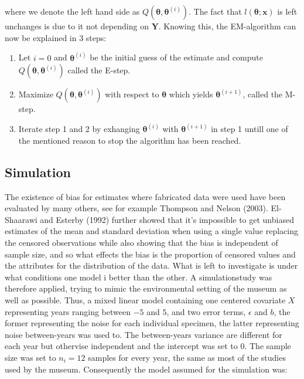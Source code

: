 \documentclass[]{article}
\providecommand{\tightlist}{%
  \setlength{\itemsep}{0pt}\setlength{\parskip}{0pt}}
\begin{document}
where we denote the left hand side as
\(Q(\mathbf{\theta}, \mathbf{\theta}^{(i)})\). The fact that
\(l(\mathbf{\theta};\mathbf{x})\) is left unchanges is due to it not
depending on \(\mathbf{Y}\). Knowing this, the EM-algorithm can now be
explained in 3 steps:

\begin{enumerate}
\def\labelenumi{\arabic{enumi}.}
\tightlist
\item
  Let \(i = 0\) and \(\mathbf{\theta}^{(i)}\) be the initial guess of
  the estimate and compute \(Q(\mathbf{\theta}, \mathbf{\theta}^{(i)})\)
  called the E-step.
\item
  Maximize \(Q(\mathbf{\theta}, \mathbf{\theta}^{(i)})\) with respect to
  \(\mathbf{\theta}\) which yields \(\mathbf{\theta}^{(i+1)}\), called
  the M-step.
\item
  Iterate step 1 and 2 by exhanging \(\mathbf{\theta}^{(i)}\) with
  \(\mathbf{\theta}^{(i+1)}\) in step 1 untill one of the mentioned
  reason to stop the algorithm has been reached.
\end{enumerate}

\hypertarget{simulation}{%
\subsection{Simulation}\label{simulation}}

The existence of bias for estimates where fabricated data were used have
been evaluated by many others, see for example Thompson and Nelson
(2003). El-Shaarawi and Esterby (1992) further showed that it's
impossible to get unbiased estimates of the mean and standard deviation
when using a single value replacing the censored observations while also
showing that the bias is independent of sample size, and so what effects
the bias is the proportion of censored values and the attributes for the
distribution of the data. What is left to investigate is under what
conditions one model i better than the other. A simulationstudy was
therefore applied, trying to mimic the environmental setting of the
museum as well as possible. Thus, a mixed linear model containing one
centered covariate \(X\) representing years ranging between \(-5\) and
\(5\), and two error terms, \(\epsilon\) and \(b\), the former
representing the noise for each individual specimen, the latter
representing noise between-years was used to. The between-years variance
are different for each year but othervise independent and the intercept
was set to \(0\). The sample size was set to \(n_i=12\) samples for
every year, the same as most of the studies used by the museum.
Consequently the model assumed for the simulation was:
\end{document}
